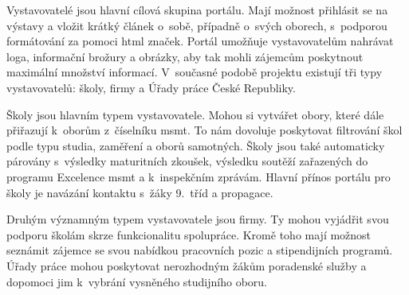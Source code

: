 Vystavovatelé jsou hlavní cílová skupina portálu. Mají možnost přihlásit se na výstavy a vložit krátký článek o~sobě,
případně o~svých oborech, s~podporou formátování za pomoci \acrshort{html} značek.
Portál umožňuje vystavovatelům nahrávat loga, informační brožury a obrázky, aby tak mohli zájemcům poskytnout maximální množství informací.
V~současné podobě projektu \bso{} existují tři typy vystavovatelů: školy, firmy a Úřady práce České Republiky. 

Školy jsou hlavním typem vystavovatele.
Mohou si vytvářet obory, které dále přiřazují k~oborům z~číselníku \acrshort{msmt}.
To nám dovoluje poskytovat filtrování škol podle typu studia, zaměření a oborů samotných.
Školy jsou také automaticky párovány s~výsledky maturitních zkoušek, výsledku soutěží zařazených do programu Excelence \acrshort{msmt} a k~inspekčním zprávám.
Hlavní přínos portálu \bso{} pro školy je navázání kontaktu s~žáky 9.~tříd a propagace. 

Druhým významným typem vystavovatele jsou firmy. Ty mohou vyjádřit svou podporu školám skrze funkcionalitu spolupráce.
Kromě toho mají možnost seznámit zájemce se svou nabídkou pracovních pozic a stipendijních programů.
Úřady práce mohou poskytovat nerozhodným žákům poradenské služby a dopomoci jim k~vybrání vysněného studijního oboru.
